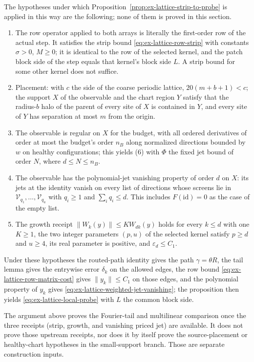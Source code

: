 The hypotheses under which
Proposition~\ref{prop:ex-lattice-strip-to-probe} is applied in this way are
the following; none of them is proved in this section.
\begin{enumerate}
\item The row operator applied to both arrays is literally the first-order
row of the actual step. It satisfies the strip bound \eqref{eq:ex-lattice-row-strip} with constants
\(\sigma>0\), \(M\ge0\); it is identical to the row of the selected
kernel, and the patch block side of the step equals that
kernel's block side \(L\). A strip bound for some other kernel does not
suffice.
\item Placement: with \(c\) the side of the coarse periodic lattice,
\(20(m+b+1)<c\); the support \(X\) of the observable and the chart region
\(Y\) satisfy that the radius-\(b\) halo of the parent of every site of
\(X\) is contained in \(Y\), and every site of \(Y\) has separation at most
\(m\) from the origin.
\item The observable is regular on \(X\) for the budget, with all ordered
derivatives of order at most the budget's order \(n_B\) along normalized
directions bounded by \(w\) on healthy configurations; this yields (6)
with \(\Phi\) the fixed jet bound of order \(N\), where
\(d\le N\le n_B\).
\item The observable has the polynomial-jet vanishing property of order
\(d\) on \(X\): its jets at the identity vanish on every list of directions
whose screens lie in \(\mathcal V_{q_1},\ldots,\mathcal V_{q_a}\) with
\(q_i\ge1\) and \(\sum_iq_i\le d\). This includes \(F(\mathrm{id})=0\) as
the case of the empty list.
\item The growth receipt \(\|W_k(y)\|\le KW_{dk}(y)\) holds for every
\(k\le d\) with one \(K\ge1\), the two integer parameters \((p,u)\) of
the selected kernel satisfy \(p\ge d\) and \(u\ge4\), its real parameter is
positive, and \(\varepsilon_d\le C_1\).
\end{enumerate}
Under these hypotheses the routed-path identity gives the path \(\gamma=
\theta R\), the tail lemma gives the entrywise error \(\delta_k\) on the
allowed edges, the row bound \eqref{eq:ex-lattice-row-matrix-cost} gives \(\|y_k\|\le C_1\) on those edges,
and the polynomial property of \(y_k\) gives \eqref{eq:ex-lattice-weighted-jet-vanishing}; the proposition then
yields \eqref{eq:ex-lattice-local-probe} with \(L\) the common block side.

The argument above proves the Fourier-tail and multilinear comparison
once the three receipts (strip, growth, and vanishing priced jet) are
available. It does not prove those upstream receipts, nor does it by
itself prove the source-placement or healthy-chart hypotheses in the
small-support branch. Those are separate construction inputs.
